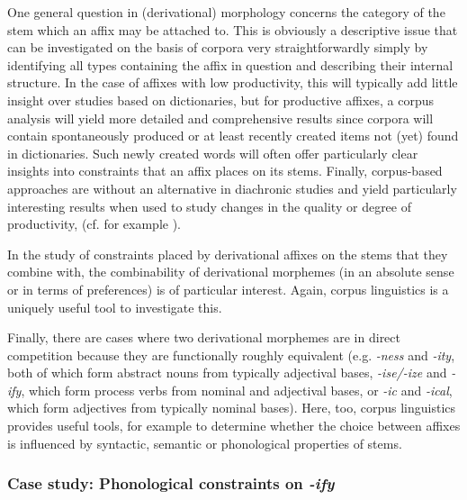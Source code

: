 One general question in (derivational) morphology  concerns the category of the stem  which an affix  may be attached to. This is obviously a descriptive  issue that can be investigated on the basis of corpora very straightforwardly simply by identifying all types  containing the affix  in question and describing their internal structure. In the case of affixes  with low productivity,  this will typically add little insight over studies based on dictionaries,  but for productive affixes,  a corpus analysis will yield more detailed and comprehensive results since corpora will contain spontaneously produced or at least recently created items not (yet) found in dictionaries.  Such newly created words will often offer particularly clear insights into constraints that an affix  places on its stems.  Finally, corpus\hyp{}based approaches are without an alternative in diachronic  studies and yield particularly interesting results when used to study changes in the quality or degree of productivity,  (cf. for example \citealt{dalton-puffer_french_1996}).

In the study of constraints placed by derivational affixes  on the stems  that they combine with, the combinability of derivational morphemes  (in an absolute sense or in terms of preferences) is of particular interest. Again, corpus linguistics is a uniquely useful tool to investigate this.

Finally, there are cases where two derivational morphemes  are in direct competition because they are functionally roughly equivalent (e.g. \textit{-ness} and \textit{-ity}, both of which form abstract nouns  from typically adjectival  bases, \textit{-ise/-ize} and \textit{-ify}, which form process  verbs  from nominal  and adjectival  bases, or \textit{-ic} and \textit{-ical}, which form adjectives  from typically nominal bases). Here, too, corpus linguistics provides useful tools, for example to determine whether the choice between affixes  is influenced by syntactic,  semantic or phonological properties of  stems.

\subsubsection{Case study: Phonological constraints on \textit{-ify}}
\label{sec:phonologicalconstraintsofify}

